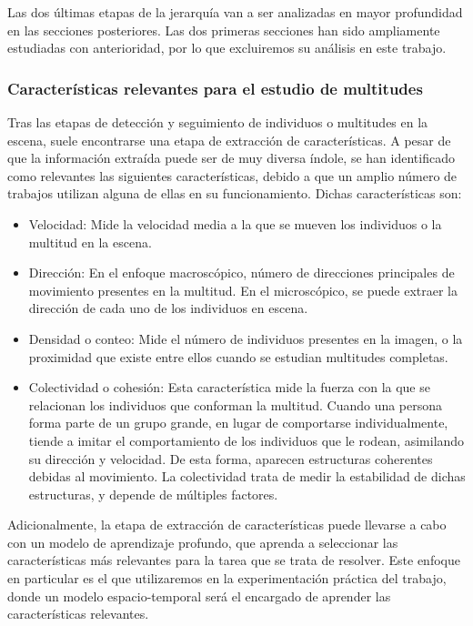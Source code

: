 \documentclass[../main.tex]{memoir}
\begin{document}
Las dos últimas etapas de la jerarquía van a ser analizadas en mayor
profundidad en las secciones posteriores. Las dos primeras secciones
han sido ampliamente estudiadas con anterioridad, por lo que
excluiremos su análisis en este trabajo.

\subsubsection{Características relevantes para el estudio de multitudes}

Tras las etapas de detección y seguimiento de individuos o multitudes
en la escena, suele encontrarse una etapa de extracción de
características. A pesar de que la información extraída puede ser de
muy diversa índole, se han identificado como relevantes las siguientes
características, debido a que un amplio número de trabajos utilizan
alguna de ellas en su funcionamiento. Dichas características son:

\begin{itemize}
\item Velocidad: Mide la velocidad media a la que se mueven los
  individuos o la multitud en la escena.
\item Dirección: En el enfoque macroscópico, número de direcciones
  principales de movimiento presentes en la multitud. En el
  microscópico, se puede extraer la dirección de cada uno de los
  individuos en escena.
\item Densidad o conteo: Mide el número de individuos presentes
  en la imagen, o la proximidad que existe entre ellos cuando se
  estudian multitudes completas.
\item Colectividad o cohesión: Esta característica mide la fuerza con
  la que se relacionan los individuos que conforman la multitud.
  Cuando una persona forma parte de un grupo grande, en lugar de
  comportarse individualmente, tiende a imitar el comportamiento de
  los individuos que le rodean, asimilando su dirección y velocidad.
  De esta forma, aparecen estructuras coherentes debidas al
  movimiento. La colectividad trata de medir la estabilidad de dichas
  estructuras, y depende de múltiples factores.
\end{itemize}

Adicionalmente, la etapa de extracción de características puede
llevarse a cabo con un modelo de aprendizaje profundo, que aprenda a
seleccionar las características más relevantes para la tarea que se
trata de resolver. Este enfoque en particular es el que utilizaremos
en la experimentación práctica del trabajo, donde un modelo
espacio-temporal será el encargado de aprender las características
relevantes.
\end{document}
